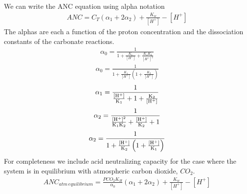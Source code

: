 \documentclass[letterpaper,10pt,english]{sphinxmanual}
\begin{document}
We can write the ANC equation using alpha notation
\begin{equation}\label{equation:Rapid_Mix/RM_Derivations:Rapid_Mix/RM_Derivations:10}
\begin{split}ANC = {C_T}({\alpha_1} + 2{\alpha_2}) + \frac{{{K_w}}}{{\left[ {{H^ + }} \right]}} - \left[ {{H^ + }} \right]\end{split}
\end{equation}
The alphas are each a function of the proton concentration and the dissociation constants of the carbonate reactions.
\begin{equation}\label{equation:Rapid_Mix/RM_Derivations:Rapid_Mix/RM_Derivations:11}
\begin{split}{\alpha_{\text{0}}} = \frac{1}{{1 + \frac{{{K_1}}}{{[{H^ + }]}} + \frac{{{K_1}{K_2}}}{{{{[{H^ + }]}^2}}}}}\end{split}
\end{equation}\begin{equation}\label{equation:Rapid_Mix/RM_Derivations:Rapid_Mix/RM_Derivations:12}
\begin{split}{\alpha_{\text{0}}} = \frac{1}{{1 + \frac{{{K_1}}}{{[{H^ + }]}}\left( {1 + \frac{{{K_2}}}{{[{H^ + }]}}} \right)}}\end{split}
\end{equation}\begin{equation}\label{equation:Rapid_Mix/RM_Derivations:Rapid_Mix/RM_Derivations:13}
\begin{split}{\alpha_{\text{1}}} = \frac{1}{{\frac{{[{{\rm H}^ + }]}}{{{{\rm K}_1}}} + 1 + \frac{{{{\rm K}_2}}}{{[{{\rm H}^ + }]}}}}\end{split}
\end{equation}\begin{equation}\label{equation:Rapid_Mix/RM_Derivations:Rapid_Mix/RM_Derivations:14}
\begin{split}{\alpha_{\text{2}}} = \frac{1}{{\frac{{{{[{{\rm H}^ + }]}^2}}}{{{{\rm K}_1}{{\rm K}_2}}} + \frac{{[{{\rm H}^ + }]}}{{{{\rm K}_2}}} + 1}}\end{split}
\end{equation}\begin{equation}\label{equation:Rapid_Mix/RM_Derivations:Rapid_Mix/RM_Derivations:15}
\begin{split}{\alpha_{\text{2}}} = \frac{1}{{1 + \frac{{[{{\rm H}^ + }]}}{{{{\rm K}_2}}}\left( {1 + \frac{{[{{\rm H}^ + }]}}{{{{\rm K}_1}}}} \right)}}\end{split}
\end{equation}
For completeness we include acid neutralizing capacity for the case where the system is in equilibrium with atmospheric carbon dioxide,
\(CO_2\).
\begin{equation}\label{equation:Rapid_Mix/RM_Derivations:Rapid_Mix/RM_Derivations:16}
\begin{split}ANC_{atm\,equilibrium} = \frac{{{P{C{O_2}}}{K_H}}}{{{\alpha_0}}}({\alpha_1} + 2{\alpha_2}) + \frac{{{K_w}}}{{\left[ {{H^ + }} \right]}} - \left[ {{H^ + }} \right]\end{split}
\end{equation}
\end{document}
